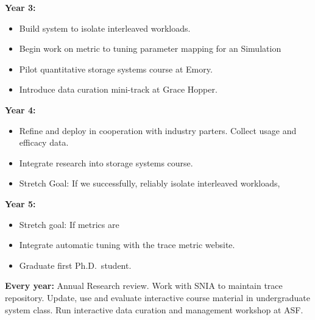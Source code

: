\noindent
\textbf{Year 3:}
\begin{itemize}
\item Build system to isolate interleaved workloads.
\item Begin work on metric to tuning parameter mapping for an \at{}
Simulation 
\item Pilot quantitative storage systems course at Emory.
\item Introduce data curation mini-track at Grace Hopper.
%
\end{itemize}
\noindent
\textbf{Year 4:} 
%
\begin{itemize}
\item Refine \at{} and deploy in cooperation with industry parters.  Collect usage and efficacy data.
\item Integrate research into storage systems course. 
\item Stretch Goal: If we successfully, reliably isolate interleaved workloads, 
\end{itemize}
\noindent
\textbf{Year 5:} 
\begin{itemize}
\item Stretch goal: If metrics are 
\item Integrate automatic tuning with the trace metric website.
\item Graduate first Ph.D.~student.
\end{itemize}

\noindent
\textbf{Every year:} Annual Research review.  Work with SNIA to maintain trace
repository.
Update, use and evaluate interactive course material in undergraduate system
class.  Run interactive data curation and management workshop at ASF. %


